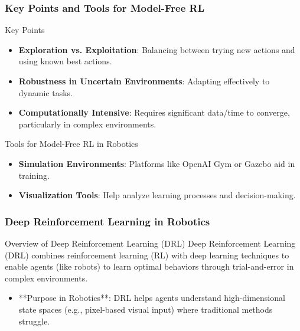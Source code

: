 \documentclass{beamer}
\begin{document}
\begin{frame}[fragile]
    \frametitle{Key Points and Tools for Model-Free RL}
    \begin{block}{Key Points}
        \begin{itemize}
            \item \textbf{Exploration vs. Exploitation}: Balancing between trying new actions and using known best actions.
            \item \textbf{Robustness in Uncertain Environments}: Adapting effectively to dynamic tasks.
            \item \textbf{Computationally Intensive}: Requires significant data/time to converge, particularly in complex environments.
        \end{itemize}
    \end{block}

    \begin{block}{Tools for Model-Free RL in Robotics}
        \begin{itemize}
            \item \textbf{Simulation Environments}: Platforms like OpenAI Gym or Gazebo aid in training.
            \item \textbf{Visualization Tools}: Help analyze learning processes and decision-making.
        \end{itemize}
    \end{block}
\end{frame}

\begin{frame}[fragile]
    \frametitle{Deep Reinforcement Learning in Robotics}
    \begin{block}{Overview of Deep Reinforcement Learning (DRL)}
        Deep Reinforcement Learning (DRL) combines reinforcement learning (RL) with deep learning techniques to enable agents (like robots) to learn optimal behaviors through trial-and-error in complex environments.
    \end{block}
    
    \begin{itemize}
        \item **Purpose in Robotics**: DRL helps agents understand high-dimensional state spaces (e.g., pixel-based visual input) where traditional methods struggle.
    \end{itemize}
\end{frame}
\end{document}
